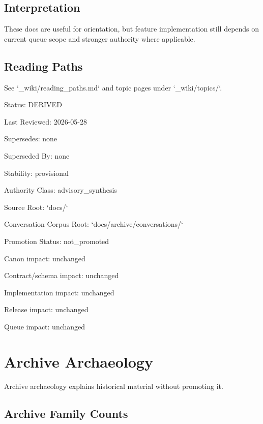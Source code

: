 \documentclass[11pt,a4paper]{report}
\begin{document}
\section{Interpretation}

These docs are useful for orientation, but feature implementation still depends on current queue scope and stronger authority where applicable.\allowbreak{}


\section{Reading Paths}

See `\_wiki/\allowbreak{}reading\_paths.\allowbreak{}md` and topic pages under `\_wiki/\allowbreak{}topics/\allowbreak{}`.\allowbreak{}



Status: DERIVED

Last Reviewed: 2026-\allowbreak{}05-\allowbreak{}28

Supersedes: none

Superseded By: none

Stability: provisional

Authority Class: advisory\_synthesis

Source Root: `docs/\allowbreak{}`

Conversation Corpus Root: `docs/\allowbreak{}archive/\allowbreak{}conversations/\allowbreak{}`

Promotion Status: not\_promoted

Canon impact: unchanged

Contract/\allowbreak{}schema impact: unchanged

Implementation impact: unchanged

Release impact: unchanged

Queue impact: unchanged


\chapter{Archive Archaeology}

Archive archaeology explains historical material without promoting it.\allowbreak{}


\section{Archive Family Counts}
\end{document}

